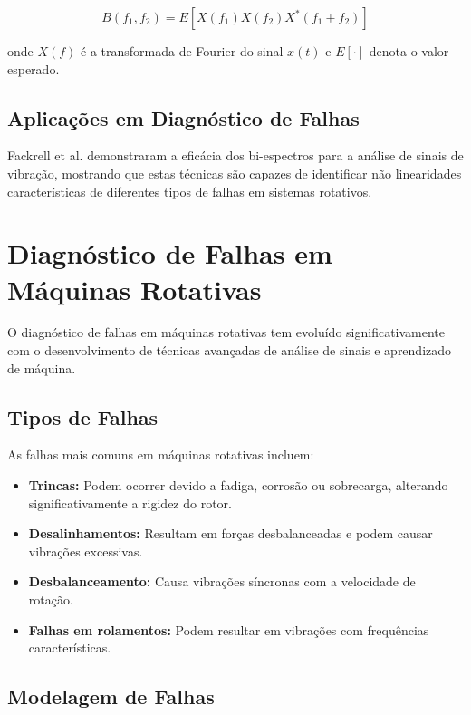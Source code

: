 \begin{equation}
B(f_1, f_2) = E[X(f_1)X(f_2)X^*(f_1 + f_2)]
\end{equation}

onde $X(f)$ é a transformada de Fourier do sinal $x(t)$ e $E[\cdot]$ denota o valor esperado.

\subsection{Aplicações em Diagnóstico de Falhas}

Fackrell et al. \cite{fackrell1995} demonstraram a eficácia dos bi-espectros para a análise de sinais de vibração, mostrando que estas técnicas são capazes de identificar não linearidades características de diferentes tipos de falhas em sistemas rotativos.

\section{Diagnóstico de Falhas em Máquinas Rotativas}

O diagnóstico de falhas em máquinas rotativas tem evoluído significativamente com o desenvolvimento de técnicas avançadas de análise de sinais e aprendizado de máquina.

\subsection{Tipos de Falhas}

As falhas mais comuns em máquinas rotativas incluem:

\begin{itemize}
    \item \textbf{Trincas:} Podem ocorrer devido a fadiga, corrosão ou sobrecarga, alterando significativamente a rigidez do rotor.
    \item \textbf{Desalinhamentos:} Resultam em forças desbalanceadas e podem causar vibrações excessivas.
    \item \textbf{Desbalanceamento:} Causa vibrações síncronas com a velocidade de rotação.
    \item \textbf{Falhas em rolamentos:} Podem resultar em vibrações com frequências características.
\end{itemize}

\subsection{Modelagem de Falhas}

